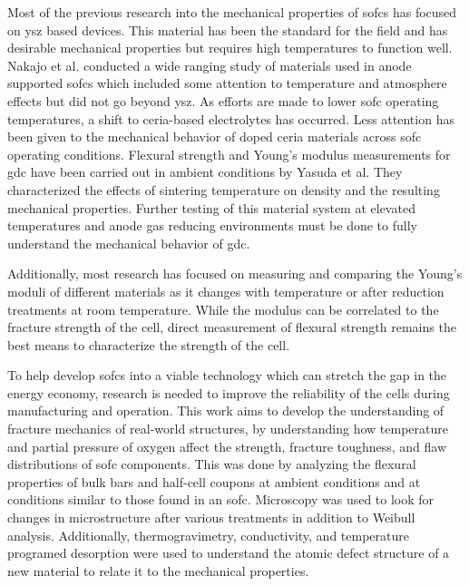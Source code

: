     Most of the previous research into the mechanical properties of \glspl{sofc} has focused on \gls{ysz} based devices.\cite{Roa2011,Yu2007,Nakajo2012}
    This material has been the standard for the field and has desirable mechanical properties but requires high temperatures to function well.
    Nakajo et al. conducted a wide ranging study of materials used in anode supported \glspl{sofc} which included some attention to temperature and atmosphere effects but did not go beyond \gls{ysz}.\cite{Nakajo2012}
    As efforts are made to lower \gls{sofc} operating temperatures, a shift to ceria-based electrolytes has occurred.
    Less attention has been given to the mechanical behavior of doped ceria materials across \gls{sofc} operating conditions.
    Flexural strength and Young's modulus measurements for \gls{gdc} have been carried out in ambient conditions by Yasuda et al.\cite{Yasuda2012}
    They characterized the effects of sintering temperature on density and the resulting mechanical properties.
    Further testing of this material system at elevated temperatures and anode gas reducing environments must be done to fully understand the mechanical behavior of \gls{gdc}.

    Additionally, most research has focused on measuring and comparing the Young's moduli of different materials as it changes with temperature or after reduction treatments at room temperature.\cite{Gutierrez-Mora2002,Giraud2008,Kushi2011,Amezawa2011}
    While the modulus can be correlated to the fracture strength of the cell, direct measurement of flexural strength remains the best means to characterize the strength of the cell.

    To help develop \glspl{sofc} into a viable technology which can stretch the gap in the energy economy, research is needed to improve the reliability of the cells during manufacturing and operation.
    This work aims to develop the understanding of fracture mechanics of real-world structures, by understanding how temperature and partial pressure of oxygen affect the strength, fracture toughness, and flaw distributions of \gls{sofc} components.
    This was done by analyzing the flexural properties of bulk bars and half-cell coupons at ambient conditions and at conditions similar to those found in an \gls{sofc}.
    Microscopy was used to look for changes in microstructure after various treatments in addition to Weibull analysis.
    Additionally, thermogravimetry, conductivity, and temperature programed desorption were used to understand the atomic defect structure of a new material to relate it to the mechanical properties.

